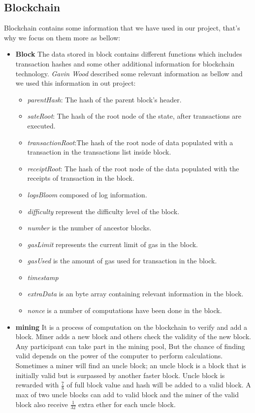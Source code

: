 \subsection{Blockchain}
Blockchain contains some information that we have used in our project, that's why we focus on them more as bellow:
\begin{itemize}
    \item \textbf{Block}
    The data stored in block contains different functions which includes transaction hashes and some other additional information for blockchain technology. \textit{Gavin Wood} described some relevant information as bellow and we used this information in out project: \\
    \begin{itemize}
        \item \textit{parentHash}: The hash of the parent block’s header.
        \item \textit{sateRoot}: The hash of the root node of the state, after transactions are executed.
        \item \textit{transactionRoot}:The hash of the root node of data populated with a transaction in the transactions list inside block.
        \item \textit{receiptRoot}: The hash of the root node of the data populated with the receipts of transaction in the block.
        \item \textit{logsBloom} composed of log information.
        \item \textit{difficulty} represent the difficulty level of the block.
        \item \textit{number} is the number of ancestor blocks.
        \item \textit{gasLimit} represents the current limit of gas in the block.
        \item \textit{gasUsed} is the amount of gas used for transaction in the block.
        \item \textit{timestamp}
        \item \textit{extraData} is an byte array containing relevant information in the block.
        \item \textit{nonce} is a number of computations have been done in the block.
    \end{itemize}
    \item \textbf{mining}
    It is a process of computation on the blockchain to verify and add a block. Miner adds a new block and others check the validity of the new block. Any participant can take part in the mining pool, But the chance of finding valid depends on the power of the computer to perform calculations. Sometimes a miner will find an uncle block; an uncle block is a block that is initially valid but is surpassed by another faster block. Uncle block is rewarded with $\frac{7}{8}$ of full block value and hash will be added to a valid block. A max of two uncle blocks can add to valid block and the miner of the valid block also receive $\frac{1}{32}$ extra ether for each uncle block\cite{Egbertsen}.

\end{itemize}
